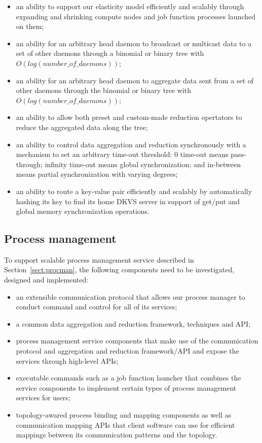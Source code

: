 \documentclass[10pt]{article}
\begin{document}
\begin{itemize}

\item{an ability to support our elasticity model 
efficiently and scalably through expanding and shrinking 
compute nodes and job function processes launched on them;}

\item{an ability for an arbitrary head daemon to broadcast 
or multicast data to a set of other daemons through a binomial 
or binary tree with $O(log(number\_of\_daemons))$;}

\item{an ability for an arbitrary head daemon to aggregate data 
sent from a set of other daemons through the binomial 
or binary tree with $O(log(number\_of\_daemons))$;}

\item{an ability to allow both preset and custom-made reduction 
opertators to reduce the aggregated data along the tree;}

\item{an ability to control data aggregation and reduction synchronously 
with a mechanism to set an arbitrary time-out threshold: 0 time-out means pass-through; 
infinity time-out means global synchronization; and
in-between means partial synchronization with varying degrees;}

\item{an ability to route a key-value pair efficiently and
scalably by automatically hashing its key to find its home DKVS server
in support of get/put and global memory synchronization operations.}

\end{itemize}

\subsection{Process management}
To support scalable process management service described in Section~\ref{sect:procman},
the following components need to be investigated, designed and implemented: 
\begin{itemize}
\item{an extensible communication protocol that allows 
our process manager to conduct command and control 
for all of its services;}
\item{a common data aggregation and reduction framework, techniques and API;} 
\item{process management service components that 
make use of the communication protocol and aggregation and reduction framework/API
and expose the services through high-level APIs;}
\item{executable commands such as a job function launcher that combines the 
service components to implement certain types of process management 
services for users;} 
\item{topology-awared process binding and mapping components as well as
communication mapping APIs that client software can use for efficient 
mappings between its communication patterns and the topology.}
\end{itemize}
\end{document}
